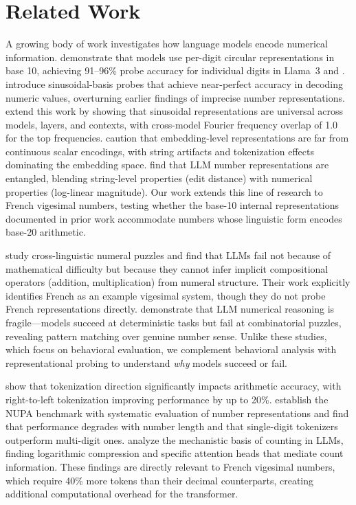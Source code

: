 \section{Related Work}
\label{sec:related}

A growing body of work investigates how language models encode numerical information.
\citet{levy2024language} demonstrate that models use per-digit circular representations in base 10, achieving 91--96\% probe accuracy for individual digits in Llama~3 and \mistral.
\citet{kadlcik2025pretrained} introduce sinusoidal-basis probes that achieve near-perfect accuracy in decoding numeric values, overturning earlier findings of imprecise number representations.
\citet{stefanik2025unravelling} extend this work by showing that sinusoidal representations are universal across models, layers, and contexts, with cross-model Fourier frequency overlap of 1.0 for the top frequencies.
\citet{davies2025language} caution that embedding-level representations are far from continuous scalar encodings, with string artifacts and tokenization effects dominating the embedding space.
\citet{marjieh2025number} find that LLM number representations are entangled, blending string-level properties (edit distance) with numerical properties (log-linear magnitude).
Our work extends this line of research to French vigesimal numbers, testing whether the base-10 internal representations documented in prior work accommodate numbers whose linguistic form encodes base-20 arithmetic.

\citet{bhattacharya2025investigating} study cross-linguistic numeral puzzles and find that LLMs fail not because of mathematical difficulty but because they cannot infer implicit compositional operators (addition, multiplication) from numeral structure.
Their work explicitly identifies French as an example vigesimal system, though they do not probe French representations directly.
\citet{rahman2025fragile} demonstrate that LLM numerical reasoning is fragile---models succeed at deterministic tasks but fail at combinatorial puzzles, revealing pattern matching over genuine number sense.
Unlike these studies, which focus on behavioral evaluation, we complement behavioral analysis with representational probing to understand \emph{why} models succeed or fail.

\citet{singh2024tokenization} show that tokenization direction significantly impacts arithmetic accuracy, with right-to-left tokenization improving performance by up to 20\%.
\citet{graphpku2024number} establish the NUPA benchmark with systematic evaluation of number representations and find that performance degrades with number length and that single-digit tokenizers outperform multi-digit ones.
\citet{counting2026mechanistic} analyze the mechanistic basis of counting in LLMs, finding logarithmic compression and specific attention heads that mediate count information.
These findings are directly relevant to French vigesimal numbers, which require 40\% more tokens than their decimal counterparts, creating additional computational overhead for the transformer.

